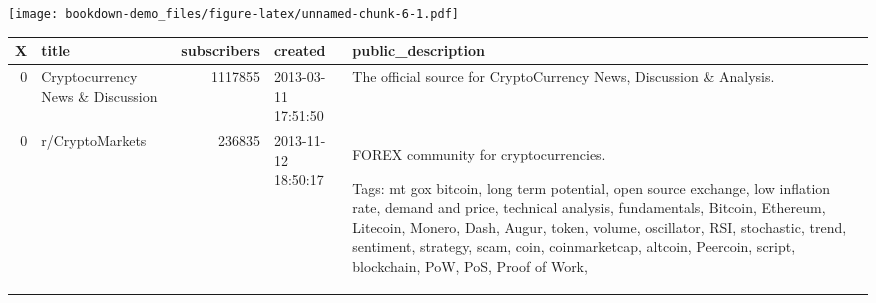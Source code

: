 \documentclass[
]{book}
\newenvironment{Shaded}{\begin{snugshade}}{\end{snugshade}}
\newcommand{\DataTypeTok}[1]{\textcolor[rgb]{0.13,0.29,0.53}{#1}}
\newcommand{\DecValTok}[1]{\textcolor[rgb]{0.00,0.00,0.81}{#1}}
\newcommand{\KeywordTok}[1]{\textcolor[rgb]{0.13,0.29,0.53}{\textbf{#1}}}
\newcommand{\NormalTok}[1]{#1}
\newcommand{\OperatorTok}[1]{\textcolor[rgb]{0.81,0.36,0.00}{\textbf{#1}}}
\newcommand{\StringTok}[1]{\textcolor[rgb]{0.31,0.60,0.02}{#1}}
\begin{document}
\begin{Shaded}
\end{Shaded}

\texttt{[image: bookdown-demo\_files/figure-latex/unnamed-chunk-6-1.pdf]}

\begin{Shaded}
\end{Shaded}

\begin{table}[H]
\centering
\begin{tabular}{r|l|r|l|l}
\hline
X & title & subscribers & created & public\_description\\
\hline
0 & Cryptocurrency News \& Discussion & 1117855 & 2013-03-11 17:51:50 & The official source for CryptoCurrency News, Discussion \& Analysis.\\
\hline
0 & r/CryptoMarkets & 236835 & 2013-11-12 18:50:17 & FOREX community for cryptocurrencies. 

Tags: mt gox bitcoin, long term potential, open source exchange, low inflation rate, demand and price, technical analysis, fundamentals, Bitcoin, Ethereum, Litecoin, Monero, Dash, Augur, token, volume, oscillator, RSI, stochastic, trend, sentiment, strategy, scam, coin, coinmarketcap, altcoin, Peercoin, script, blockchain, PoW, PoS, Proof of Work,\\
\hline
\end{tabular}
\end{table}
\end{document}

